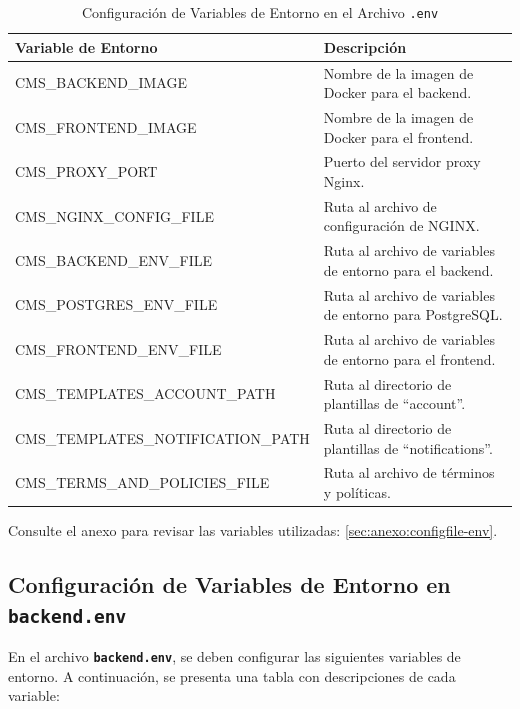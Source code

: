 \begin{table}[H]
    \centering
    \begin{tabular}{|l|p{7cm}|}
    \hline
    \textbf{Variable de Entorno} & \textbf{Descripción} \\
    \hline
    CMS\_BACKEND\_IMAGE & Nombre de la imagen de Docker para el backend. \\
    \hline
    CMS\_FRONTEND\_IMAGE & Nombre de la imagen de Docker para el frontend.\\
    \hline
    CMS\_PROXY\_PORT & Puerto del servidor proxy Nginx. \\
    \hline
    CMS\_NGINX\_CONFIG\_FILE & Ruta al archivo de configuración de NGINX. \\
    \hline
    CMS\_BACKEND\_ENV\_FILE & Ruta al archivo de variables de entorno para el backend. \\
    \hline
    CMS\_POSTGRES\_ENV\_FILE & Ruta al archivo de variables de entorno para PostgreSQL. \\
    \hline
    CMS\_FRONTEND\_ENV\_FILE & Ruta al archivo de variables de entorno para el frontend. \\
    \hline
    CMS\_TEMPLATES\_ACCOUNT\_PATH & Ruta al directorio de plantillas de ``account''. \\
    \hline
    CMS\_TEMPLATES\_NOTIFICATION\_PATH & Ruta al directorio de plantillas de ``notifications''.\\
    \hline
    CMS\_TERMS\_AND\_POLICIES\_FILE & Ruta al archivo de términos y políticas. \\
    \hline
    \end{tabular}
    \caption{Configuración de Variables de Entorno en el Archivo \texttt{.env}}
    \label{tab:env-file-variables}
\end{table}

Consulte el anexo para revisar las variables utilizadas: \ref{sec:anexo:configfile-env}.


\subsection{Configuración de Variables de Entorno en \texttt{backend.env}}

En el archivo \texttt{\textbf{backend.env}}, se deben configurar las siguientes variables de entorno. A continuación, se presenta una tabla con descripciones de cada variable:

